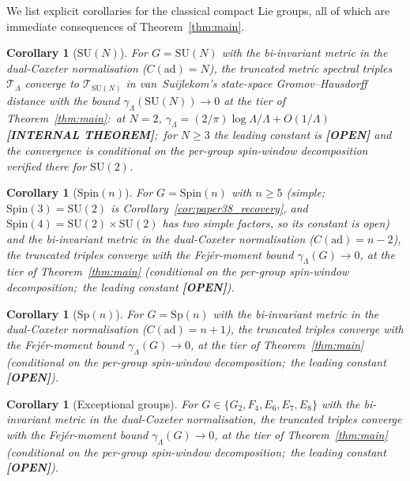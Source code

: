 \documentclass[11pt,a4paper]{article}
\theoremstyle{plain}
\newtheorem{corollary}[theorem]{Corollary}
\theoremstyle{definition}
\newcommand{\Lammax}{\Lambda}
\newcommand{\Tcal}{\mathcal{T}}
\newcommand{\SU}{\mathrm{SU}}
\newcommand{\Spin}{\mathrm{Spin}}
\newcommand{\Sp}{\mathrm{Sp}}
\newcommand{\Cas}{C}
\begin{document}
We list explicit corollaries for the classical compact Lie groups,
all of which are immediate consequences of Theorem~\ref{thm:main}.

\begin{corollary}[$\SU(N)$]\label{cor:sun}
For $G = \SU(N)$ with the bi-invariant metric in the dual-Coxeter
normalisation ($\Cas(\mathrm{ad}) = N$), the truncated metric
spectral triples $\Tcal_\Lammax$ converge to $\Tcal_{\SU(N)}$ in
van~Suijlekom's state-space Gromov--Hausdorff distance with the bound
$\gamma_\Lammax(\SU(N)) \to 0$ \emph{at the tier of Theorem~\ref{thm:main}}:\
at $N = 2$, $\gamma_\Lammax = (2/\pi)\log\Lammax/\Lammax + O(1/\Lammax)$
\textbf{[INTERNAL THEOREM]};\ for $N \ge 3$ the leading constant is
\textbf{[OPEN]} and the convergence is conditional on the per-group
spin-window decomposition verified there for $\SU(2)$.
\end{corollary}

\begin{corollary}[$\Spin(n)$]\label{cor:spin}
For $G = \Spin(n)$ with $n \ge 5$ (simple;\ $\Spin(3) = \SU(2)$ is
Corollary~\ref{cor:paper38_recovery}, and $\Spin(4) = \SU(2) \times \SU(2)$
has two simple factors, so its constant is open) and the bi-invariant
metric in the dual-Coxeter normalisation ($\Cas(\mathrm{ad}) = n - 2$), the
truncated triples converge with the Fej\'er-moment bound
$\gamma_\Lammax(G) \to 0$, at the tier of
Theorem~\ref{thm:main} (conditional on the per-group spin-window
decomposition;\ the leading constant \textbf{[OPEN]}).
\end{corollary}

\begin{corollary}[$\Sp(n)$]\label{cor:sp}
For $G = \Sp(n)$ with the bi-invariant metric in the dual-Coxeter
normalisation ($\Cas(\mathrm{ad}) = n + 1$), the truncated triples
converge with the Fej\'er-moment bound $\gamma_\Lammax(G) \to 0$, at the tier of Theorem~\ref{thm:main}
(conditional on the per-group spin-window decomposition;\ the leading
constant \textbf{[OPEN]}).
\end{corollary}

\begin{corollary}[Exceptional groups]\label{cor:exceptional}
For $G \in \{G_2, F_4, E_6, E_7, E_8\}$ with the bi-invariant metric
in the dual-Coxeter normalisation, the truncated triples converge with
the Fej\'er-moment bound $\gamma_\Lammax(G) \to 0$, at the tier of Theorem~\ref{thm:main} (conditional
on the per-group spin-window decomposition;\ the leading constant
\textbf{[OPEN]}).
\end{corollary}
\end{document}
